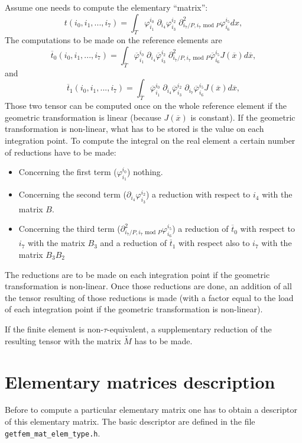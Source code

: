 \documentclass[11pt,a4paper]{article}
\begin{document}
Assume one needs to compute the elementary ``matrix'':
$$ t(i_0, i_1, ..., i_7) = \int_{T} \varphi_{i_1}^{i_0}\; \partial_{i_4} \varphi_{i_3}^{i_2}\; \partial^2_{i_7 / P, i_7 \mbox{ mod } P} \varphi_{i_6}^{i_5} dx, $$ 
The computations to be made on the reference elements are
$$ \overline{t}_0(i_0, i_1, ..., i_7) = \int_{\overline{T}} \overline{\varphi}_{i_1}^{i_0}\; \partial_{i_4} \overline{\varphi}_{i_3}^{i_2}\; \partial^2_{i_7 / P, i_7 \mbox{ mod } P} \overline{\varphi}_{i_6}^{i_5}  J(\overline{x}) d\overline{x}, $$
and
$$ \overline{t}_1(i_0, i_1, ..., i_7) = \int_{\overline{T}} \overline{\varphi}_{i_1}^{i_0}\; \partial_{i_4} \overline{\varphi}_{i_3}^{i_2}\; \partial_{i_7} \overline{\varphi}_{i_6}^{i_5}  J(\overline{x}) d\overline{x}, $$
Those two tensor can be computed once on the whole reference element if the geometric transformation is linear (because $J(\overline{x})$ is constant). If the geometric transformation is non-linear, what has to be stored is the value on each integration point. To compute the integral on the real element a certain number of reductions have to be made:
\begin{itemize}
   \item Concerning the first term ($\varphi_{i_1}^{i_0}$) nothing.
   \item Concerning the second term ($\partial_{i_4} \varphi_{i_3}^{i_2}$) a reduction with respect to $i_4$ with the matrix $B$.
   \item Concerning the third term ($\partial^2_{i_7 / P, i_7 \mbox{ mod } P} \varphi_{i_6}^{i_5}$) a reduction of $\overline{t}_0$ with respect to $i_7$ with the matrix $B_3$ and a reduction of $\overline{t}_1$ with respect also to $i_7$ with the matrix $B_3B_2$
\end{itemize}
The reductions are to be made on each integration point if the geometric transformation is non-linear. Once those reductions are done, an addition of all the tensor resulting of those reductions is made (with a factor equal to the load of each integration point if the geometric transformation is non-linear).

If the finite element is non-$\tau$-equivalent, a supplementary reduction of the resulting tensor with the matrix $\tilde{M}$ has to be made.

\section{Elementary matrices description}

Before to compute a particular elementary matrix one has to obtain a descriptor  of this elementary matrix. The basic descriptor are defined in the file {\tt getfem\_mat\_elem\_type.h}. 
\end{document}
